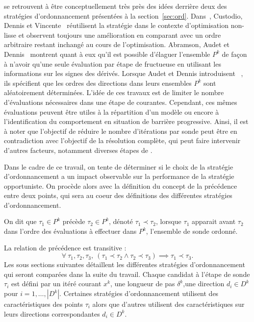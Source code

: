 se retrouvent à être conceptuellement très près des idées derrière deux des stratégies d'ordonnancement présentées à la section~\ref{sec:ord}. Dans~\cite{CuDeVi08}, Custodio, Dennis et Vincente~\cite{CuDeVi08} réutilisent la stratégie dans le contexte d'optimisation non-lisse et observent toujours une amélioration en comparant avec un ordre arbitraire restant inchangé au cours de l'optimisation. Abramson, Audet et Dennis~\cite{AbAuDe04a} montrent quant à eux qu'il est possible d'élaguer l'ensemble $P^k$ de façon à n'avoir qu'une seule évaluation par étape de \POLL fructueuse en utilisant les informations sur les signes des dérivés. Lorsque Audet et Dennis introduisent \MADS~\cite{AuDe2006}, ils spécifient que les ordres des directions dans leurs ensembles $P^k$ sont aléatoirement déterminées. L'idée de ces travaux est de limiter le nombre d'évaluations nécessaires dans une étape de \POLL courantes. Cependant, ces mêmes évaluations peuvent être utiles à la répartition d'un modèle ou encore à l'identification du comportement en situation de barrière progressive. Ainsi, il est à noter que l'objectif de réduire le nombre d'itérations par sonde peut être en contradiction avec l'objectif de la résolution complète, qui peut faire intervenir d'autres facteurs, notamment diverses étapes de \SEARCH.

Dans le cadre de ce travail, on tente de déterminer si le choix de la stratégie d'ordonnancement a un impact observable sur la performance de la stratégie opportuniste. On procède alors avec la définition du concept de la précédence entre deux points, qui sera au coeur des définitions des différentes stratégies d'ordonnancement.

\begin{definition}[Précédence]\label{def:prec}
On dit que $\tau_1 \in P^k$ précède $\tau_2 \in P^k$, dénoté $\tau_1 \prec \tau_2$, lorsque $\tau_1$ apparait avant $\tau_2$ dans l'ordre des évaluations à effectuer dans $P^k$, l'ensemble de sonde ordonné.
\end{definition}
La relation de précédence est transitive :
\begin{equation*}
	\forall~\tau_1,\tau_2,\tau_3,~(\tau_1\prec \tau_2 \wedge \tau_2\prec \tau_3) \implies \tau_1 \prec \tau_3.
\end{equation*}
Les sous sections suivantes détaillent les différentes stratégies d'ordonnancement qui seront comparées dans la suite du travail. Chaque candidat à l'étape de sonde $\tau_i$ est défini par un itéré courant $x^k$, une longueur de pas $\delta^k$,une direction $d_i \in D^k$ pour  $i = 1,\dots,|D^k|$. Certaines stratégies d'ordonnancement utilisent des caractéristiques des points $\tau_i$ alors que d'autres utilisent des caractéristiques sur leurs directions correspondantes $d_i \in D^k$.  
